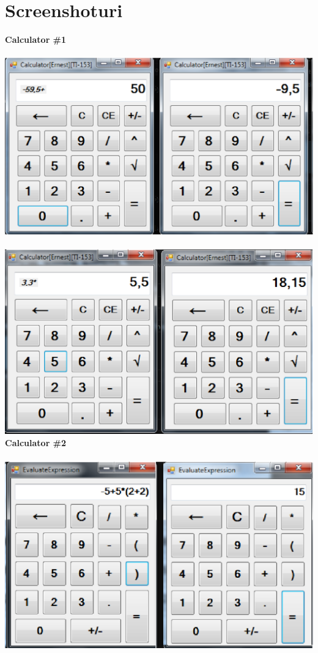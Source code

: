 \section{Screenshoturi}
\textbf{Calculator \#1}\\
\\
\includegraphics[width=\textwidth]{4.eps}\\
\\
\includegraphics[width=\textwidth]{5.eps}\\
\clearpage
\textbf{Calculator \#2}\\
\\
\includegraphics[width=\textwidth]{6.eps}\\
